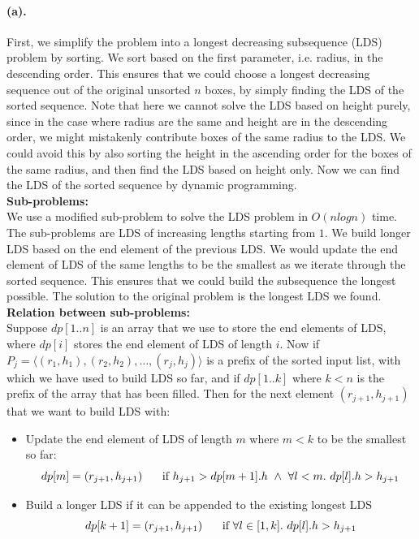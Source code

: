 \documentclass[12pt]{article}
\begin{document}
\paragraph{(a).}
First, we simplify the problem into a longest decreasing subsequence (LDS) problem by sorting. We sort based on the first parameter, i.e. radius, in the descending order. This ensures that we could choose a longest decreasing sequence out of the original unsorted \(n\) boxes, by simply finding the LDS of the sorted sequence. Note that here we cannot solve the LDS based on height purely, since in the case where radius are the same and height are in the descending order, we might mistakenly contribute boxes of the same radius to the LDS. We could avoid this by also sorting the height in the ascending order for the boxes of the same radius, and then find the LDS based on height only.
Now we can find the LDS of the sorted sequence by dynamic programming. \\
\textbf{Sub-problems:}\\
We use a modified sub-problem to solve the LDS problem in \(O(nlogn)\) time. The sub-problems are LDS of increasing lengths starting from \(1\). We build longer LDS based on the end element of the previous LDS. We would update the end element of LDS of the same lengths to be the smallest as we iterate through the sorted sequence. This ensures that we could build the subsequence the longest possible. The solution to the original problem is the longest LDS we found.\\
\textbf{Relation between sub-problems:} \\
Suppose \(dp[1..n]\) is an array that we use to store the end elements of LDS, where \(dp[i]\) stores the end element of LDS of length \(i\). Now if \(P_j = \langle(r_1,h_1), (r_2, h_2), \hdots, (r_j, h_j)\rangle\) is a prefix of the sorted input list, with which we have used to build LDS so far, and if \(dp[1..k]\) where \(k < n\) is the prefix of the array that has been filled. Then for the next element \((r_{j+1}, h_{j+1})\) that we want to build LDS with:
\begin{itemize}
     \setlength \itemsep{0em} 
     \item Update the end element of LDS of length \(m\) where \(m < k\) to be the smallest so far:
     \begin{equation*}
          dp[m] = (r_{j+1}, h_{j+1}) \hspace{0.5cm} \text{ if } h_{j+1} > dp[m+1].h\ \land\ \forall l<m.\ dp[l].h > h_{j+1} 
     \end{equation*}
     \item Build a longer LDS if it can be appended to the existing longest LDS
     \begin{equation*}
          dp[k+1] = (r_{j+1}, h_{j+1}) \hspace{0.5cm} \text{ if } \forall l\in[1,k].\ dp[l].h > h_{j+1}
     \end{equation*}
\end{itemize}
 
\end{document}
